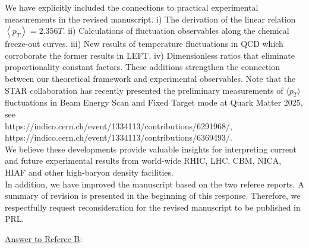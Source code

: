 \documentclass[aps,article,author-year,notitlepage,showpacs]{revtex4-2}
\begin{document}
\begin{itemize}
We have explicitly included the connections to practical experimental measurements in the revised manuscript. i) The derivation of the linear relation $\left\langle p_T\right\rangle=2.356 T$. ii) Calculations of fluctuation observables along the chemical freeze-out curves. iii) New results of temperature fluctuations in QCD which corroborate the former results in LEFT. iv) Dimensionless ratios that eliminate proportionality constant factors. These additions strengthen the connection between our theoretical framework and experimental observables. Note that the STAR collaboration has recently presented the preliminary measurements of $\langle p_{T} \rangle$ fluctuations in Beam Energy Scan and Fixed Target mode at Quark Matter 2025, see \\
https://indico.cern.ch/event/1334113/contributions/6291968/,\\
https://indico.cern.ch/event/1334113/contributions/6369493/. \\
We believe these developments provide valuable insights for interpreting current and future experimental results from world-wide RHIC, LHC, CBM, NICA, HIAF and other high-baryon density facilities.\\[1ex]

In addition, we have improved the manuscript based on the two referee reports. A summary of revision is presented in the beginning of this response. Therefore, we respectfully request reconsideration for the revised manuscript to be published in PRL.\\[3ex]

\end{itemize}



\noindent \underline{Answer to Referee B}:\\
\end{document}

